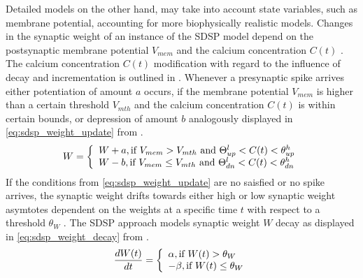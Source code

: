 Detailed models on the other hand, may take into account state variables, such as membrane potential, 
accounting for more biophysically realistic models.
Changes in the synaptic weight of an instance of the \ac{SDSP} model depend on the postsynaptic membrane potential $V_{mem}$ and 
the calcium concentration $C(t)$ \cite{Synaptic_plasticity}.
The calcium concentration $C(t)$  modification with regard to the influence of decay and incrementation is outlined in \cite{simulation_STDP}.
Whenever a presynaptic spike arrives either potentiation of amount $a$ occurs, if the membrane potential $V_{mem}$ is higher than a certain threshold $V_{mth}$ and the 
calcium concentration $C(t)$ is within certain bounds, or depression of amount $b$ analogously displayed in \autoref{eq:sdsp_weight_update} from \cite{Synaptic_plasticity}.
%
\begin{equation}
    \centering
    \label{eq:sdsp_weight_update} 
    W = 
    \left\{
    \begin{array}{ll}
        W + a, \text{if } V_{mem} > V_{mth} \text{ and } \Theta^l_{up} < C(t) < \theta^h_{up}\\
        W - b, \text{if } V_{mem} \le V_{mth} \text{ and } \Theta^l_{dn} < C(t) < \theta^h_{dn}
    \end{array}
    \right.
\end{equation}
%
If the conditions from \autoref{eq:sdsp_weight_update} are no saisfied or no spike arrives, 
the synaptic weight drifts towards either high or low synaptic weight asymtotes dependent on the weights at a specific time $t$ 
with respect to a threshold $\theta_W$ \cite{Synaptic_plasticity}.
The \ac{SDSP} approach models synaptic weight $W$ decay as displayed in \autoref{eq:sdsp_weight_decay} from \cite{Synaptic_plasticity}.
%
\begin{equation}
    \centering
    \label{eq:sdsp_weight_decay}
    \frac{dW(t)}{dt} = 
    \left\{
    \begin{array}{ll}
        \alpha, \text{if } W(t) > \theta_W\\
        - \beta, \text{if } W(t) \le \theta_W\\
    \end{array}
    \right.
\end{equation}

